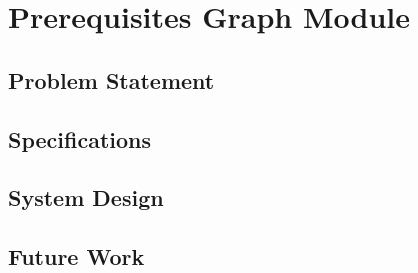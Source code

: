 \section{Prerequisites Graph Module}

\subsection{Problem Statement}



\subsection{Specifications}

\subsection{System Design}

\subsection{Future Work}
